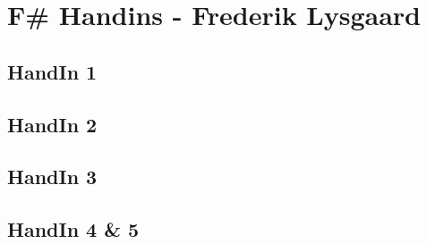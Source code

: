 \section{F\# Handins - Frederik Lysgaard}
\label{Appendix_FSharp_Frederik}

\subsection{HandIn 1}
\label{Appendix_FSharp_Frederik_1}
\subsection{HandIn 2}
\label{Appendix_FSharp_Frederik_2}
\subsection{HandIn 3}
\label{Appendix_FSharp_Frederik_3}
\subsection{HandIn 4 \& 5}
\label{Appendix_FSharp_Frederik_4and5}